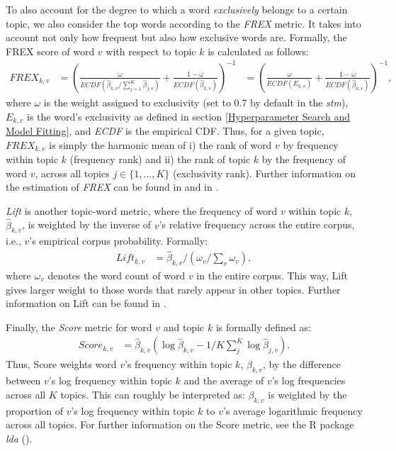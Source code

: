 To also account for the degree to which a word \textit{exclusively} belongs to a certain topic, we also consider the top words according to the \textit{FREX} metric. It takes into account not only how frequent but also how exclusive words are. Formally, the FREX score of word $v$ with respect to topic $k$ is calculated as follows:
\begin{align*}
FREX_{k,v} &= (\frac{\omega}{ECDF(\hat{\beta}_{k,v}/\sum_{j=1}^{K}\hat{\beta}_{j,v})} + \frac{1-\omega}{ECDF(\hat{\beta}_{k,v})})^{-1} &= (\frac{\omega}{ECDF(E_{k,v})} + \frac{1-\omega}{ECDF(\hat{\beta}_{k,v})})^{-1},
\end{align*}
where $\omega$ is the weight  assigned to exclusivity (set to 0.7 by default in the \textit{stm}), $E_{k,v}$ is the word's exclusivity as defined in section \ref{Hyperparameter Search and Model Fitting}, and \textit{ECDF} is the empirical CDF. Thus, for a given topic, $FREX_{k,v}$ is simply the harmonic mean of i) the rank of word $v$ by frequency within topic $k$ (frequency rank) and ii) the rank of topic $k$ by the frequency of word $v$, across all topics $j \in \{1,...,K\}$ (exclusivity rank). Further information on the estimation of \textit{FREX} can be found in \cite{stm} and in \cite{bischof2012summarizing}.

\textit{Lift} is another topic-word metric, where the frequency of word $v$ within topic $k$,  $\hat{\beta}_{k,v}$, is weighted by the inverse of $v$'s relative frequency across the entire corpus, i.e., $v$'s empirical corpus probability. Formally:
\begin{align*}
Lift_{k,v} &= \hat{\beta}_{k,v}/(\omega_{v}/\sum_{v}\omega_{v}),
\end{align*}
where $\omega_{v}$ denotes the word count of word $v$ in the entire corpus. This way, Lift gives larger weight to those words that rarely appear in other topics. Further information on Lift can be found in \cite{taddy2012estimation}.

Finally, the \textit{Score} metric for word $v$ and topic $k$ is formally defined as:
\begin{align*}
Score_{k,v} &= \hat{\beta}_{k,v}(\log\hat{\beta}_{k,v} - 1/K\sum_{j}^{K}\log\hat{\beta}_{j,v}).
\end{align*}
Thus, Score weights word $v$'s frequency within topic $k$, $\beta_{k,v}$, by the difference between $v$'s log frequency within topic $k$ and the average of $v$'s log frequencies across all $K$ topics. This can roughly be interpreted as: $\beta_{k,v}$ is weighted by the proportion of $v$'s log frequency within topic $k$ to $v$'s average logarithmic frequency across all topics. For further information on the Score metric, see the R package \textit{lda} (\citealp{chang2010package}).

